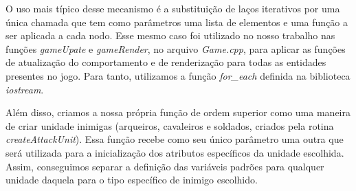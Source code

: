 \documentclass[rel_mlp]{iiufrgs}
\begin{document}
		O uso mais típico desse mecanismo é a substituição de laços iterativos por uma única chamada que tem como parâmetros uma lista de elementos e uma função a ser aplicada a cada nodo. Esse mesmo caso foi utilizado no nosso trabalho nas funções \textit{gameUpate} e \textit{gameRender}, no arquivo \textit{Game.cpp}, para aplicar as funções de atualização do comportamento e de renderização para todas as entidades presentes no jogo. Para tanto, utilizamos a função \textit{for\_each}	definida na biblioteca \textit{iostream}.

	Além disso, criamos a nossa própria função de ordem superior como uma maneira de criar unidade inimigas (arqueiros, cavaleiros e soldados, criados pela rotina \textit{createAttackUnit}). Essa função recebe como seu único parâmetro uma outra que será utilizada para a inicialização dos atributos específicos da unidade escolhida. Assim, conseguimos separar a definição das variáveis padrões para qualquer unidade daquela para o tipo específico de inimigo escolhido.




%

%

\end{document}
